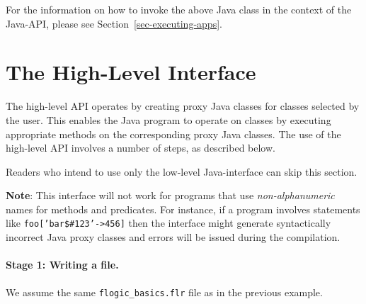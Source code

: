  For the information on how to invoke the above Java class in the context
 of the Java-\FLSYSTEM API,
 please see Section~\ref{sec-executing-apps}.

\section{The High-Level Interface}

The high-level API operates by creating proxy Java classes for 
\FLSYSTEM classes selected by the user.
This enables the Java program to operate on \FLSYSTEM classes by
executing appropriate methods on the corresponding proxy Java classes.
The use of the high-level API involves a number of steps, as described below.

Readers who intend to use only the low-level Java-\FLSYSTEM interface can skip this section.

\textbf{Note}: This interface will not work for \FLSYSTEM programs that
use \emph{non-alphanumeric} names for methods and predicates. For instance,
if a program involves statements like \texttt{foo['bar\$\#123'->456]} then
the interface might generate syntactically incorrect Java proxy classes and
errors will be issued during the compilation. 

\paragraph{Stage 1: Writing a \FLSYSTEM file.}
We assume the same {\tt flogic\_basics.flr} file as in the previous
example.

